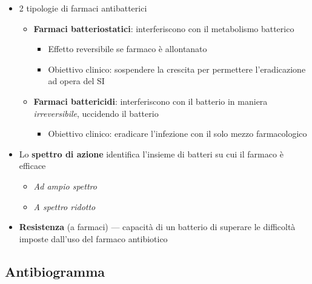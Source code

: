 \documentclass[italian,]{article}
\providecommand{\tightlist}{%
  \setlength{\itemsep}{0pt}\setlength{\parskip}{0pt}}
\begin{document}
\begin{itemize}
\tightlist
\item
  2 tipologie di farmaci antibatterici

  \begin{itemize}
  \tightlist
  \item
    \textbf{Farmaci batteriostatici}: interferiscono con il metabolismo
    batterico

    \begin{itemize}
    \tightlist
    \item
      Effetto reversibile se farmaco è allontanato
    \item
      Obiettivo clinico: sospendere la crescita per permettere
      l'eradicazione ad opera del SI
    \end{itemize}
  \item
    \textbf{Farmaci battericidi}: interferiscono con il batterio in
    maniera \emph{irreversibile}, uccidendo il batterio

    \begin{itemize}
    \tightlist
    \item
      Obiettivo clinico: eradicare l'infezione con il solo mezzo
      farmacologico
    \end{itemize}
  \end{itemize}
\item
  Lo \textbf{spettro di azione} identifica l'insieme di batteri su cui
  il farmaco è efficace

  \begin{itemize}
  \tightlist
  \item
    \emph{Ad ampio spettro}
  \item
    \emph{A spettro ridotto}
  \end{itemize}
\item
  \textbf{Resistenza} (a farmaci) --- capacità di un batterio di
  superare le difficoltà imposte dall'uso del farmaco antibiotico
\end{itemize}

\hypertarget{antibiogramma}{%
\subsection{Antibiogramma}\label{antibiogramma}}
\end{document}
